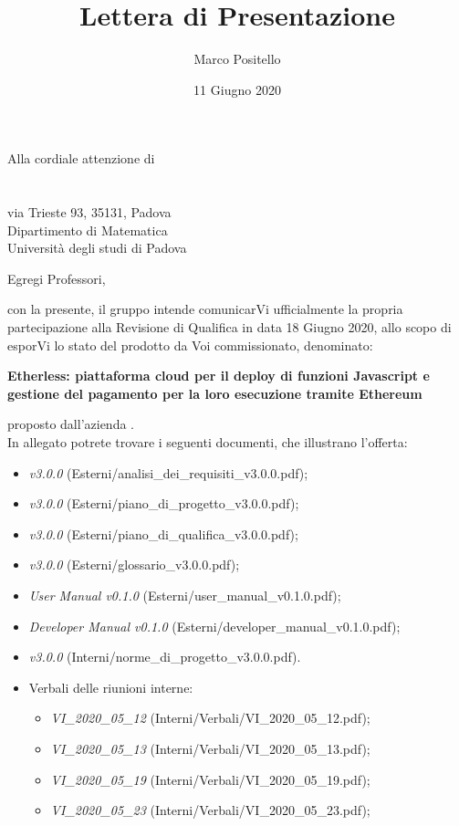 \documentclass[a4paper]{letter}
\title{Lettera di Presentazione}
\author{Marco Positello}
\begin{document}
\begin{letter} {Alla cordiale attenzione di \\ \TV \\ \RC \\ via Trieste 93, 35131, Padova\\ Dipartimento di Matematica \\ Università degli studi di Padova }
  \vspace*{-0.4\baselineskip}
\date{11 Giugno 2020}
\opening{Egregi Professori,}
con la presente, il gruppo \Gruppo{} intende comunicarVi ufficialmente la propria partecipazione alla Revisione di Qualifica in data 18 Giugno 2020, allo scopo di esporVi lo stato del prodotto da Voi commissionato, denominato:
  \begin{center}
    \textbf{Etherless: piattaforma cloud per il deploy di funzioni Javascript e gestione del pagamento per la loro esecuzione tramite Ethereum}
  \end{center}
  proposto dall'azienda \Proponente.\\
  In allegato potrete trovare i seguenti documenti, che illustrano l'offerta:
  \begin{itemize}
    \item \AdR{} \textit{v3.0.0} (Esterni/analisi\_dei\_requisiti\_v3.0.0.pdf);
    \item \PdP{} \textit{v3.0.0} (Esterni/piano\_di\_progetto\_v3.0.0.pdf);
    \item \PdQ{} \textit{v3.0.0} (Esterni/piano\_di\_qualifica\_v3.0.0.pdf);
    \item \Glossario{} \textit{v3.0.0} (Esterni/glossario\_v3.0.0.pdf);
		\item \textit{User Manual v0.1.0} (Esterni/user\_manual\_v0.1.0.pdf);
		\item \textit{Developer Manual v0.1.0} (Esterni/developer\_manual\_v0.1.0.pdf);
    \item \NdP{} \textit{v3.0.0} (Interni/norme\_di\_progetto\_v3.0.0.pdf).
    \item Verbali delle riunioni interne:
      \begin{itemize}
				\item \textit{VI\_2020\_05\_12} (Interni/Verbali/VI\_2020\_05\_12.pdf);
				\item \textit{VI\_2020\_05\_13} (Interni/Verbali/VI\_2020\_05\_13.pdf);
				\item \textit{VI\_2020\_05\_19} (Interni/Verbali/VI\_2020\_05\_19.pdf);
				\item \textit{VI\_2020\_05\_23} (Interni/Verbali/VI\_2020\_05\_23.pdf);

\end{itemize}
\end{itemize}
\end{letter}
\end{document}
